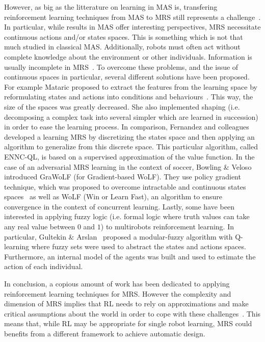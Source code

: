     However, as big as the litterature on learning in MAS is, transfering reinforcement learning techniques from MAS to MRS still represents a challenge~\parencite{Yang2005}. In particular, while results in MAS offer interesting perspectives, MRS necessitate continuous actions and/or states spaces. This is something which is not that much studied in classical MAS. Additionally, robots must often act without complete knowledge about the environment or other individuals. Information is usually incomplete in MRS~\parencite{Yang2005, Fernandez2005}. To overcome these problems, and the issue of continuous spaces in particular, several different solutions have been proposed. For example Mataric proposed to extract the features from the learning space by reformulating states and actions into conditions and behaviours~\parencite{Mataric1997}. This way, the size of the spaces was greatly decreased. She also implemented shaping (i.e. decomposing a complex task into several simpler which are learned in succession) in order to ease the learning process. In comparison, Fernandez and colleagues~\parencite{Fernandez2005} developed a learning MRS by discretizing the states space and then applying an algorithm to generalize from this discrete space. This particular algorithm, called ENNC-QL, is based on a supervised approximation of the value function. In the case of an adversarial MRS learning in the context of soccer, Bowling \& Veloso~\parencite{Bowling2003} introduced GraWoLF (for Gradient-based WoLF). They use policy gradient technique, which was proposed to overcome intractable and continuous states spaces~\parencite{Sutton2000} as well as WoLF (Win or Learn Fast), an algorithm to ensure convergence in the context of concurrent learning. Lastly, some have been interested in applying fuzzy logic (i.e. formal logic where truth values can take any real value between $0$ and $1$) to multirobots reinforcement learning. In particular, Gultekin \& Arslan~\parencite{Gultekin2002} proposed a modular-fuzzy algorithm with Q-learning where fuzzy sets were used to abstract the states and actions spaces. Furthermore, an internal model of the agents was built and used to estimate the action of each individual. 

    In conclusion, a copious amount of work has been dedicated to applying reinforcement learning techniques for MRS. However the complexity and dimension of MRS implies that RL needs to rely on approximations and make critical assumptions about the world in order to cope with these challenges~\parencite{Yang2005, Parker2008}. This means that, while RL may be appropriate for single robot learning, MRS could benefits from a different framework to achieve automatic design.

